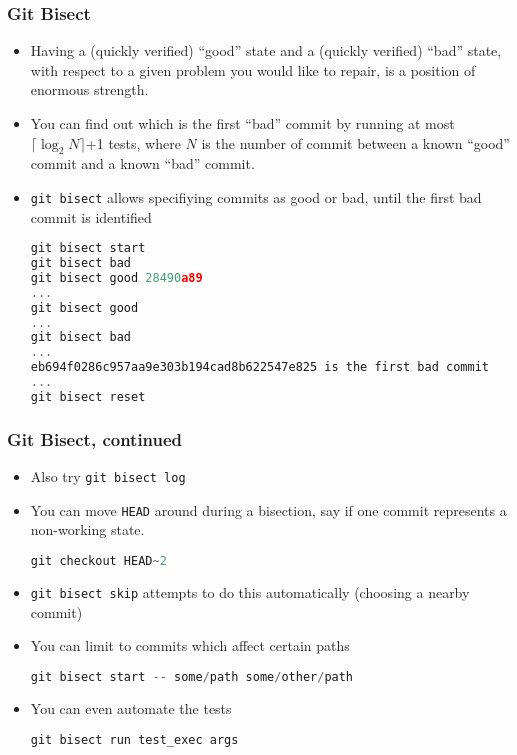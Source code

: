 \documentclass{beamer}
\begin{document}
\begin{frame}[fragile]
\frametitle{Git Bisect}
\begin{itemize}
\item Having a (quickly verified) ``good'' state and a (quickly verified) ``bad'' state, with respect to a given problem you would like to repair, is a position of enormous strength.
\item You can find out which is the first ``bad'' commit by running at most $\lceil \log_2{N} \rceil$+1 tests, where $N$ is the number of commit between a known ``good'' commit and a known ``bad'' commit.
\item \lstinline{git bisect} allows specifiying commits as good or bad, until the first bad commit is identified
\begin{lstlisting}[language=C++,
basicstyle=\tiny\ttfamily]
git bisect start
git bisect bad
git bisect good 28490a89
...
git bisect good
...
git bisect bad
...
eb694f0286c957aa9e303b194cad8b622547e825 is the first bad commit
...
git bisect reset
\end{lstlisting}
\end{itemize}
\end{frame}

\begin{frame}[fragile]
\frametitle{Git Bisect, continued}
\begin{itemize}
\item Also try \lstinline{git bisect log}
\item You can move \lstinline{HEAD} around during a bisection, say if one commit represents a non-working state.
\begin{lstlisting}[language=C++]
git checkout HEAD~2
\end{lstlisting}
\item \lstinline{git bisect skip} attempts to do this automatically (choosing a nearby commit)
\item You can limit to commits which affect certain paths
\begin{lstlisting}[language=C++]
git bisect start -- some/path some/other/path
\end{lstlisting}
\item You can even automate the tests
\begin{lstlisting}
git bisect run test_exec args
\end{lstlisting}
\end{itemize}
\end{frame}
\end{document}
